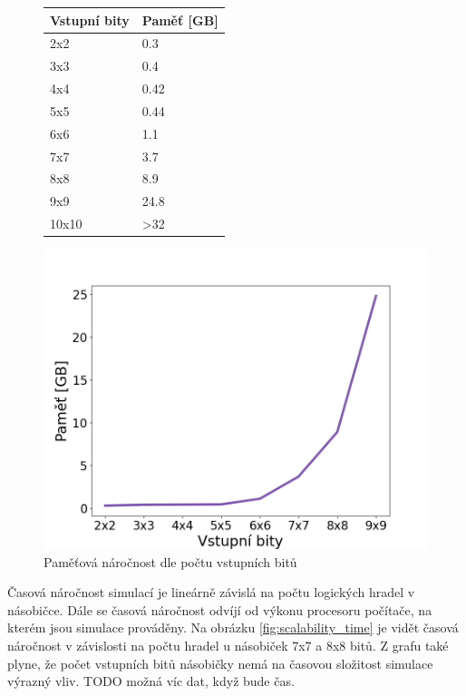 \begin{figure}[H]
  \begin{minipage}[b]{.47\linewidth}
    \centering
    \begin{tabular}{|l|l|}
        \textbf{Vstupní bity} & \textbf{Paměť [GB]} \\ \hline
        2x2 & 0.3 \\ 
        3x3 & 0.4 \\ 
        4x4 & 0.42 \\ 
        5x5 & 0.44 \\ 
        6x6 & 1.1 \\ 
        7x7 & 3.7 \\ 
        8x8 & 8.9 \\ 
        9x9 & 24.8 \\ 
        10x10 & >32 \\ 
    \end{tabular}
    \label{tab:scalability_memory}
  \end{minipage}
  \begin{minipage}[b]{.47\linewidth}
    \centering
    \includegraphics[width=\linewidth]{obrazky-figures/scalability_memory.png}
    \caption{Paměťová náročnost dle počtu vstupních bitů}
    \label{fig:scalability_memory}
  \end{minipage}\hfill
\end{figure}
\pagebreak
Časová náročnost simulací je lineárně závislá na počtu logických hradel v násobičce. Dále se časová náročnost odvíjí od výkonu procesoru počítače, na kterém jsou simulace prováděny. Na obrázku \ref{fig:scalability_time} je vidět časová náročnost v závislosti na počtu hradel u násobiček 7x7 a 8x8 bitů. Z grafu také plyne, že počet vstupních bitů násobičky nemá na časovou složitost simulace výrazný vliv. TODO možná víc dat, když bude čas.


